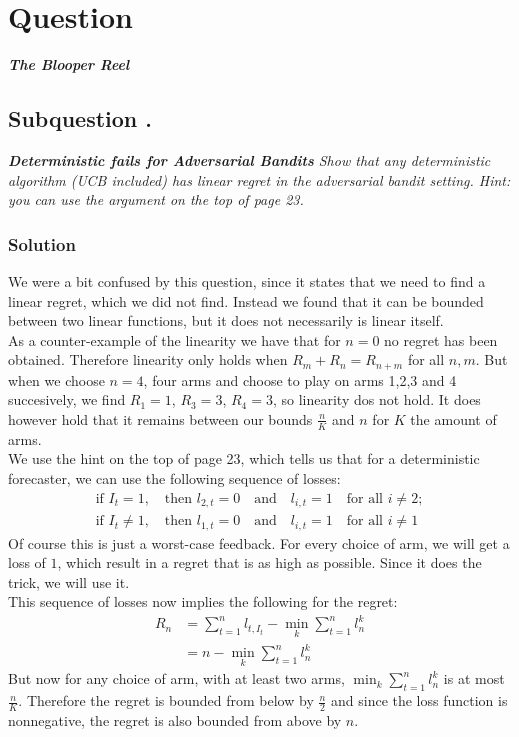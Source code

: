 \documentclass{article}
\newcounter{counterquestion}
\newenvironment{question}[1]
{
\stepcounter{counterquestion}
\section*{Question \thecounterquestion}
\emph{#1} 
} 
{
}
\newcounter{countersubquestion}[counterquestion]
\newenvironment{subquestion}[1]
{
\stepcounter{countersubquestion}
\subsection*{Subquestion \thecounterquestion .\thecountersubquestion}
\emph{#1} 
} 
{
}
\newenvironment{solution}
{
\subsubsection*{Solution}
} 
{
}
\begin{document}
\begin{question}{\textbf{The Blooper Reel}}

\begin{subquestion}{\textbf{Deterministic fails for Adversarial Bandits} Show that any deterministic algorithm (UCB included) has linear regret in the adversarial bandit setting. Hint: you can use the argument on the top of page 23.}
\end{subquestion}
\begin{solution}
We were a bit confused by this question, since it states that we need to find a linear regret, which we did not find. Instead we found that it can be bounded between two linear functions, but it does not necessarily is linear itself.\\
As a counter-example of the linearity we have that for $n=0$ no regret has been obtained. Therefore linearity only holds when $R_m+R_n=R_{n+m}$ for all $n,m$. But when we choose $n=4$, four arms and choose to play on arms 1,2,3 and 4 succesively, we find $R_1=1$, $R_3=3$, $R_4=3$, so linearity dos not hold. It does however hold that it remains between our bounds $\frac{n}{K}$ and $n$ for $K$ the amount of arms.\\
We use the hint on the top of page 23, which tells us that for a deterministic forecaster, we can use the following sequence of losses:
\begin{align*}
\text{if }I_t=1, \quad \text{then }l_{2,t}=0\quad \text{and}\quad l_{i,t}=1\quad \text{for all }i\neq 2;\\
\text{if }I_t\neq 1, \quad \text{then }l_{1,t}=0\quad \text{and}\quad l_{i,t}=1\quad \text{for all }i\neq 1
\end{align*}
Of course this is just a worst-case feedback. For every choice of arm, we will get a loss of $1$, which result in a regret that is as high as possible. Since it does the trick, we will use it.\\
This sequence of losses now implies the following for the regret:
\begin{align*}
R_n&=\sum _{t=1} ^n l_{t,I_t}-\min _k \sum _{t=1}^nl_n^k\\
&=n-\min _k \sum _{t=1}^nl_n^k
\end{align*}
But now for any choice of arm, with at least two arms, $\min _k \sum _{t=1}^nl_n^k$ is at most $\frac{n}{K}$. Therefore the regret is bounded from below by $\frac{n}{2}$ and since the loss function is nonnegative, the regret is also bounded from above by $n$.
\end{solution}


\end{question}
\end{document}
